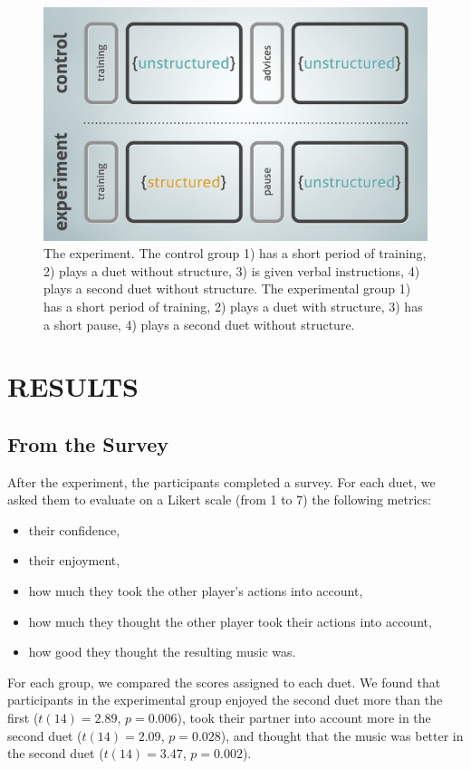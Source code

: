 \documentclass{article}
\begin{document}
\begin{figure}[tb]
\includegraphics[width=\columnwidth]{exp.png}
\caption{The experiment. The control group 1) has a short period of training, 2) plays a duet without structure, 3) is given verbal instructions, 4) plays a second duet without structure. The experimental group 1) has a short period of training, 2) plays a duet with structure, 3) has a short pause, 4) plays a second duet without structure.}
\label{experiment}
\end{figure}


\section{RESULTS}

\subsection{From the Survey}

After the experiment, the participants completed a survey. For each duet, we asked them to evaluate on a Likert scale (from 1 to 7) the following metrics:
\begin{itemize}
\item their confidence,
\item their enjoyment,
\item how much they took the other player's actions into account,
\item how much they thought the other player took their actions into account,
\item how good they thought the resulting music was.
\end{itemize}
For each group, we compared the scores assigned to each duet. We found that participants in the experimental group enjoyed the second duet more than the first ($t(14) = 2.89$, $p = 0.006$), took their partner into account more in the second duet ($t(14) = 2.09$, $p = 0.028$), and thought that the music was better in the second duet ($t(14) = 3.47$, $p = 0.002$).
\end{document}
